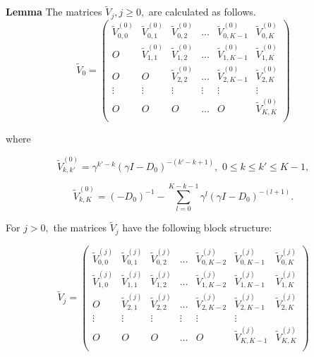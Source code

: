 \documentclass[12pt, a4paper]{article}
\begin{document}
{\bf Lemma} The matrices $\tilde {V}_j, j\geq0,$  are calculated as follows.
 $$
     \tilde {V}_0 =\left(\begin{array}{ccccccc}
       \tilde {V}_{0,0}^{(0)}     &  \tilde {V}_{0,1}^{(0)}    &  \tilde {V}_{0,2}^{(0)}  & \ldots  &  \tilde {V}_{0,K-1}^{(0)}&   \tilde {V}_{0,K}^{(0)}  \\
       O    &       \tilde {V}_{1,1}^{(0)}     &  \tilde {V}_{1,2}^{(0)}    &  \ldots  &   \tilde {V}_{1,K-1}^{(0)}&   \tilde {V}_{1,K}^{(0)} \\
       O& O    &       \tilde {V}_{2,2}^{(0)}        &  \ldots  &   \tilde {V}_{2,K-1}^{(0)}&   \tilde {V}_{2,K}^{(0)}   \\
             \vdots & \vdots &\vdots& \vdots& \vdots& \vdots         \\
              O& O    &      O        &  \ldots  &   O&   \tilde {V}_{K,K}^{(0)}   \\
      \end{array} \right)
  $$

where


$$
\tilde {V}_{k,k'}^{(0)}=\gamma^{k'-k}(\gamma I-D_0)^{-(k'-k+1)}, \,\,0\leq k\leq k'\leq K-1,
$$


$$
\tilde {V}_{k,K}^{(0)}=(-D_0)^{-1}-\sum\limits_{l=0}^{K-k-1}\gamma^l(\gamma I-D_0)^{-(l+1)}.
$$



For $j>0,$ the matrices $\tilde {V}_j$ have the following block structure:

 $$
     \tilde {V}_j =\left(\begin{array}{ccccccc}
       \tilde {V}_{0,0}^{(j)}     &  \tilde {V}_{0,1}^{(j)}    &  \tilde {V}_{0,2}^{(j)}  & \ldots  &  \tilde {V}_{0,K-2}^{(j)}&    \tilde {V}_{0,K-1}^{(j)}&   \tilde {V}_{0,K}^{(j)}  \\
       \tilde {V}_{1,0}^{(j)}    &       \tilde {V}_{1,1}^{(j)}     &  \tilde {V}_{1,2}^{(j)}    &  \ldots  &   \tilde {V}_{1,K-2}^{(j)}& \tilde {V}_{1,K-1}^{(j)}&   \tilde {V}_{1,K}^{(j)} \\
       O&  \tilde {V}_{2,1}^{(j)}    &       \tilde {V}_{2,2}^{(j)}        &  \ldots  &   \tilde {V}_{2,K-2}^{(j)}& \tilde {V}_{2,K-1}^{(j)}&   \tilde {V}_{2,K}^{(j)}   \\
             \vdots & \vdots &\vdots& \vdots& \vdots& \vdots         \\
              O& O    &      O        &  \ldots  &    O& \tilde {V}_{K,K-1}^{(j)}&   \tilde {V}_{K,K}^{(j)}   \\
      \end{array} \right)
  $$
\end{document}
